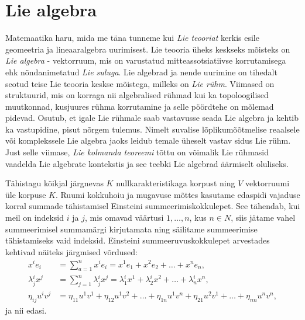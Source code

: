 

\section{Lie algebra}

Matemaatika haru, mida me täna tunneme kui \emph{Lie teooriat} kerkis esile
geomeetria ja lineaaralgebra uurimisest. Lie teooria üheks keskseks mõisteks
on \emph{Lie algebra} - vektorruum, mis on varustatud
mitteassotsiatiivse korrutamisega ehk nõndanimetatud \emph{Lie suluga}.
Lie algebrad ja nende uurimine on tihedalt seotud teise Lie teooria keskse
mõistega, milleks on \emph{Lie rühm}. Viimased on
struktuurid, mis on korraga nii algebralised rühmad kui ka topoloogilised
muutkonnad, kusjuures rühma korrutamine ja selle pöördtehe on mõlemad
pidevad. Osutub, et igale Lie rühmale saab vastavusse seada Lie algebra ja
kehtib ka vastupidine, pisut nõrgem tulemus. Nimelt suvalise lõplikumõõtmelise
reaalsele või komplekssele Lie algebra jaoks leidub temale üheselt
vastav sidus Lie rühm.\cite{kirillov2008introduction} Just selle viimase,
\emph{Lie kolmanda teoreemi} tõttu on võimalik Lie rühmasid vaadelda
Lie algebrate kontekstis ja see teebki Lie algebrad äärmiselt oluliseks.

Tähistagu kõikjal järgnevas $K$ nullkarakteristikaga korpust ning $V$
vektorruumi üle korpuse $K$. Ruumi kokkuhoiu ja mugavuse mõttes
kasutame edaspidi vajaduse korral summade tähistamisel
Einsteini summeerimiskokkulepet. See tähendab, kui meil on indeksid $i$ ja $j$,
mis omavad väärtusi $1, \dots, n$, kus $n \in N$, siis jätame vahel
summeerimisel summamärgi kirjutamata ning säilitame summeerimise tähistamiseks
vaid indeksid. Einsteini summeeruvuskokkulepet arvestades kehtivad näiteks
järgmised võrdused:
\begin{align*}
    x^{i} e_{i} &= \sum_{a=1}^{n} x^{i} e_{i} = 
        x^{1} e_{1} + x^{2} e_{2} + \dots + x^{n} e_{n}, \\
    \lambda{^i_j} x^{j} &= \sum_{j=1}^{n} 
        \lambda{^i_j} x^{j} = \lambda{^i_1} x^{1} + 
        \lambda{^i_2} x^{2} + 
        \dots +\lambda{^i_n} x^{n},\\
    \eta_{ij} u^{i} v^{j} &= \eta_{11} u^{1} v^{1} + 
        \eta_{12} u^{1} v^{2} + \dots + \eta_{1n} u^{1} v^{n} + 
        \eta_{21} u^{2} v^{1} + \dots + \eta_{nn} u^{n} v^{n},
\end{align*}
ja nii edasi.

